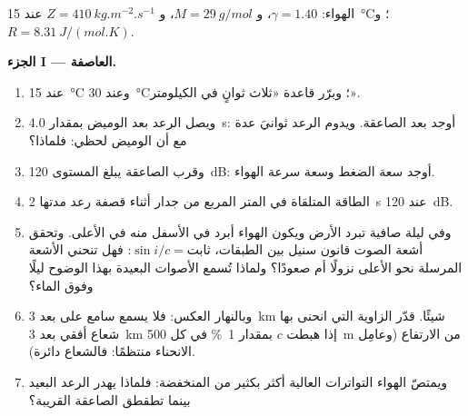 \begin{problem}
\label{pb:b2:sound-waves:1}

الهواء: $\gamma = 1.40$، و $M = \qty{29}{g/mol}$، و $Z = \qty{410}{kg.m^{-2}.s^{-1}}$ عند
\qty{15}{\degreeCelsius}؛ و $R = \qty{8.31}{J/(mol.K)}$.

\medskip
\noindent\textbf{الجزء I --- العاصفة.}
\begin{enumerate}
  \item {} عند \qty{15}{\degreeCelsius} وعند \qty{30}{\degreeCelsius}؛
        وبرّر قاعدة «ثلاث ثوانٍ في الكيلومتر».
  \item ويصل الرعد بعد الوميض بمقدار \qty{4.0}{s}: أوجد بعد
        الصاعقة. ويدوم الرعد ثوانيَ عدة مع أن الوميض
        لحظي: فلماذا؟
  \item وقرب الصاعقة يبلغ المستوى \qty{120}{dB}: أوجد سعة الضغط
        وسعة سرعة الهواء.
  \item الطاقة المتلقاة في المتر المربع من جدار أثناء قصفة رعد
        مدتها \qty{2}{s} عند \qty{120}{dB}.
  \item وفي ليلة صافية تبرد الأرض ويكون الهواء أبرد في الأسفل
        منه في الأعلى. وتحقق أشعة الصوت قانون سنيل بين الطبقات،
        $\sin i/c = \text{ثابت}$: فهل تنحني الأشعة المرسلة نحو الأعلى نزولًا أم صعودًا؟
        ولماذا تُسمع الأصوات البعيدة بهذا الوضوح ليلًا وفوق الماء؟
  \item وبالنهار العكس: فلا يسمع سامع على بعد \qty{3}{km} شيئًا.
        قدّر الزاوية التي انحنى بها شعاع أفقي بعد
        \qty{3}{km} إذا هبطت $c$ بمقدار \qty{1}{\%} في كل \qty{500}{m} من الارتفاع
        (وعامِل الانحناء منتظمًا: فالشعاع دائرة).

  \item ويمتصّ الهواء التواترات العالية أكثر بكثير من المنخفضة: فلماذا
        يهدر الرعد البعيد بينما تطقطق الصاعقة القريبة؟
\end{enumerate}


\end{problem}
